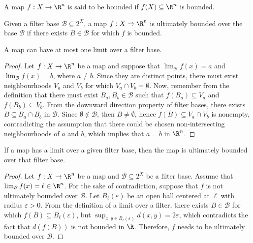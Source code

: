 \begin{definition}[Bounded]\label{def: bounded-several}
A map \(f: X \to \R^n\) is said to be bounded if \(f(X) \subseteq \R^n\) is
bounded.
\end{definition}

\begin{definition}\label{def: ulti-bounded-several}
Given a filter base \(\mathcal B \subseteq 2^X\), a map \(f: X \to \R^n\) is
ultimately bounded over the base \(\mathcal B\) if there exists \(B \in
\mathcal B\) for which \(f\) is bounded.
\end{definition}

\begin{proposition}
A map can have at most one limit over a filter base.
\end{proposition}

\begin{proof}
Let \(f: X \to \R^n\) be a map and suppose that \(\lim_\mathcal{B} f(x) = a\)
and \(\lim_\mathcal{B} f(x) = b\), where \(a \neq b\). Since they are distinct
points, there must exist neighbourhoods \(V_a\) and \(V_b\) for which \(V_a
\cap V_b = \emptyset\). Now, remember from the definition that there must
exist \(B_a, B_b \in \mathcal B\) such that \(f(B_a) \subseteq V_a\) and
\(f(B_b) \subseteq V_b\). From the downward direction property of filter
bases, there exists \(B \subseteq B_a \cap B_b\) in \(\mathcal B\). Since
\(\emptyset \not\in \mathcal B\), then \(B \neq \emptyset\), hence \(f(B)
\subseteq V_a \cap V_b\) is nonempty, contradicting the assumption that there
could be chosen non-intersecting neighbourhoods of \(a\) and \(b\), which
implies that \(a = b\) in \(\R^n\).
\end{proof}

\begin{proposition}
If a map has a limit over a given filter base, then the map is ultimately
bounded over that filter base.
\end{proposition}

\begin{proof}
Let \(f: X \to \R^n\) be a map and \(\mathcal B \subseteq 2^X\) be a filter
base. Assume that \(\lim_\mathcal{B} f(x) = \ell \in \R^n\). For the sake of
contradiction, suppose that \(f\) is not ultimately bounded over \(\mathcal
B\). Let \(B_\ell(\varepsilon)\) be an open ball centered at \(\ell\) with
radius \(\varepsilon > 0\). From the definition of a limit over a filter,
there exists \(B \in \mathcal B\) for which \(f(B) \subseteq
B_\ell(\varepsilon)\), but \(\sup_{x, y \in B_\ell(\varepsilon)} d(x, y) = 2
\varepsilon\), which contradicts the fact that \(d(f(B))\) is not bounded in
\(\R\). Therefore, \(f\) needs to be ultimately bounded over \(\mathcal B\).
\end{proof}

